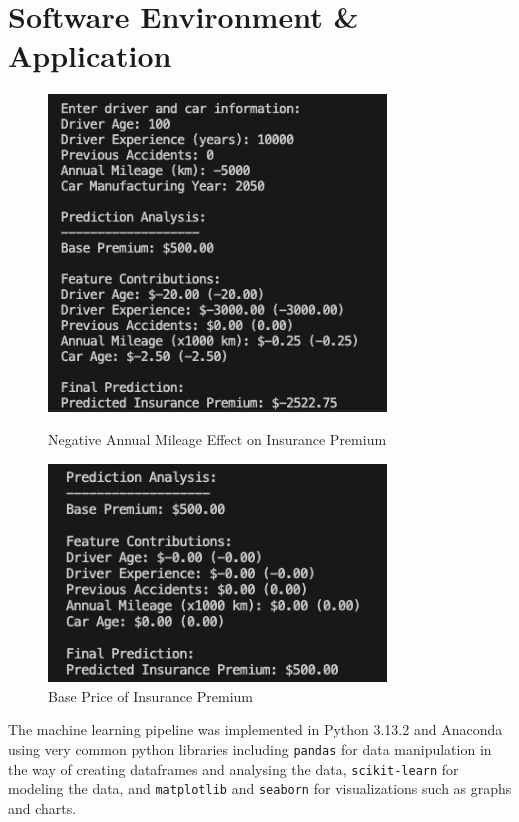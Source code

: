 \documentclass{article}
\begin{document}
\newpage
\section{Software Environment \& Application}

\begin{figure}[h]
\centering
    \begin{minipage}{0.45\textwidth}
        \includegraphics[width=0.8\textwidth]{negative_price.png}
        \caption{Negative Annual Mileage Effect on Insurance Premium}\label{fig:negative_mileage}
    \end{minipage}
    \hfill
    \begin{minipage}{0.45\textwidth}
        \includegraphics[width=0.8\textwidth]{base_price.png}
        \caption{Base Price of Insurance Premium}\label{fig:base_price}
    \end{minipage}
\end{figure}

The machine learning pipeline was implemented in Python 3.13.2 and Anaconda using very common python libraries including \texttt{pandas} for data manipulation in the way of creating dataframes and analysing the data, \texttt{scikit-learn} for modeling the data, and \texttt{matplotlib} and \texttt{seaborn} for visualizations such as graphs and charts.
\end{document}
